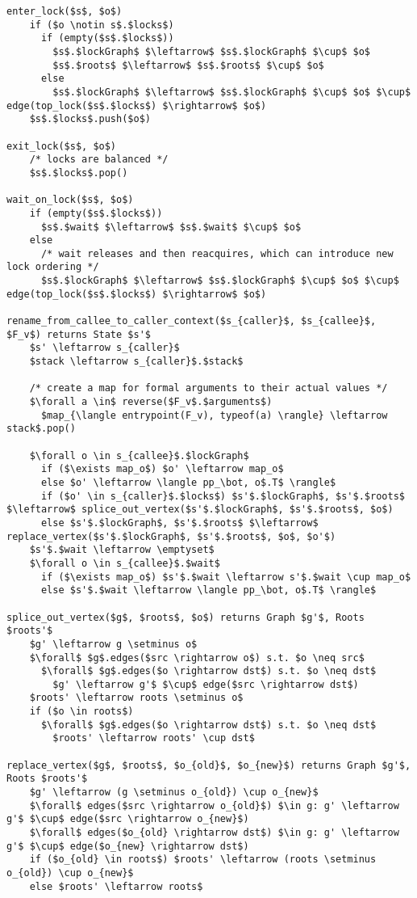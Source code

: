 \begin{lstlisting}[language=CSharp,mathescape,caption=Helper methods,label=fig:rulesHelpers,float]
enter_lock($s$, $o$)
    if ($o \notin s$.$locks$)
      if (empty($s$.$locks$))
        $s$.$lockGraph$ $\leftarrow$ $s$.$lockGraph$ $\cup$ $o$
        $s$.$roots$ $\leftarrow$ $s$.$roots$ $\cup$ $o$
      else
        $s$.$lockGraph$ $\leftarrow$ $s$.$lockGraph$ $\cup$ $o$ $\cup$ edge(top_lock($s$.$locks$) $\rightarrow$ $o$)
    $s$.$locks$.push($o$)

exit_lock($s$, $o$)
    /* locks are balanced */
    $s$.$locks$.pop()

wait_on_lock($s$, $o$)
    if (empty($s$.$locks$))
      $s$.$wait$ $\leftarrow$ $s$.$wait$ $\cup$ $o$
    else
      /* wait releases and then reacquires, which can introduce new lock ordering */
      $s$.$lockGraph$ $\leftarrow$ $s$.$lockGraph$ $\cup$ $o$ $\cup$ edge(top_lock($s$.$locks$) $\rightarrow$ $o$)
      
rename_from_callee_to_caller_context($s_{caller}$, $s_{callee}$, $F_v$) returns State $s'$
    $s' \leftarrow s_{caller}$
    $stack \leftarrow s_{caller}$.$stack$
    
    /* create a map for formal arguments to their actual values */ 
    $\forall a \in$ reverse($F_v$.$arguments$)
      $map_{\langle entrypoint(F_v), typeof(a) \rangle} \leftarrow stack$.pop()
      
    $\forall o \in s_{callee}$.$lockGraph$
      if ($\exists map_o$) $o' \leftarrow map_o$
      else $o' \leftarrow \langle pp_\bot, o$.T$ \rangle$
      if ($o' \in s_{caller}$.$locks$) $s'$.$lockGraph$, $s'$.$roots$ $\leftarrow$ splice_out_vertex($s'$.$lockGraph$, $s'$.$roots$, $o$)
      else $s'$.$lockGraph$, $s'$.$roots$ $\leftarrow$ replace_vertex($s'$.$lockGraph$, $s'$.$roots$, $o$, $o'$)
    $s'$.$wait \leftarrow \emptyset$        
    $\forall o \in s_{callee}$.$wait$
      if ($\exists map_o$) $s'$.$wait \leftarrow s'$.$wait \cup map_o$
      else $s'$.$wait \leftarrow \langle pp_\bot, o$.T$ \rangle$

splice_out_vertex($g$, $roots$, $o$) returns Graph $g'$, Roots $roots'$
    $g' \leftarrow g \setminus o$
    $\forall$ $g$.edges($src \rightarrow o$) s.t. $o \neq src$
      $\forall$ $g$.edges($o \rightarrow dst$) s.t. $o \neq dst$
        $g' \leftarrow g'$ $\cup$ edge($src \rightarrow dst$)
    $roots' \leftarrow roots \setminus o$
    if ($o \in roots$) 
      $\forall$ $g$.edges($o \rightarrow dst$) s.t. $o \neq dst$
        $roots' \leftarrow roots' \cup dst$

replace_vertex($g$, $roots$, $o_{old}$, $o_{new}$) returns Graph $g'$, Roots $roots'$
    $g' \leftarrow (g \setminus o_{old}) \cup o_{new}$
    $\forall$ edges($src \rightarrow o_{old}$) $\in g: g' \leftarrow g'$ $\cup$ edge($src \rightarrow o_{new}$)
    $\forall$ edges($o_{old} \rightarrow dst$) $\in g: g' \leftarrow g'$ $\cup$ edge($o_{new} \rightarrow dst$)
    if ($o_{old} \in roots$) $roots' \leftarrow (roots \setminus o_{old}) \cup o_{new}$
    else $roots' \leftarrow roots$
\end{lstlisting}

